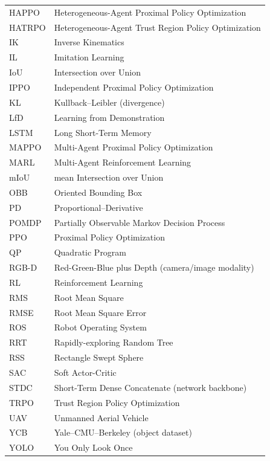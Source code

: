\begin{xltabular}{\textwidth}{@{}l X@{}}
HAPPO & Heterogeneous-Agent Proximal Policy Optimization \\
HATRPO & Heterogeneous-Agent Trust Region Policy Optimization \\
IK & Inverse Kinematics \\
IL & Imitation Learning \\
IoU & Intersection over Union \\
IPPO & Independent Proximal Policy Optimization \\
KL & Kullback--Leibler (divergence) \\
LfD & Learning from Demonstration \\
LSTM & Long Short-Term Memory \\
MAPPO & Multi-Agent Proximal Policy Optimization \\
MARL & Multi-Agent Reinforcement Learning \\
mIoU & mean Intersection over Union \\
OBB & Oriented Bounding Box \\
PD & Proportional--Derivative \\
POMDP & Partially Observable Markov Decision Process \\
PPO & Proximal Policy Optimization \\
QP & Quadratic Program \\
RGB-D & Red-Green-Blue plus Depth (camera/image modality) \\
RL & Reinforcement Learning \\
RMS & Root Mean Square \\
RMSE & Root Mean Square Error \\
ROS & Robot Operating System \\
RRT & Rapidly-exploring Random Tree \\
RSS & Rectangle Swept Sphere \\
SAC & Soft Actor-Critic \\
STDC & Short-Term Dense Concatenate (network backbone) \\
TRPO & Trust Region Policy Optimization \\
UAV & Unmanned Aerial Vehicle \\
YCB & Yale--CMU--Berkeley (object dataset) \\
YOLO & You Only Look Once \\
\end{xltabular}


